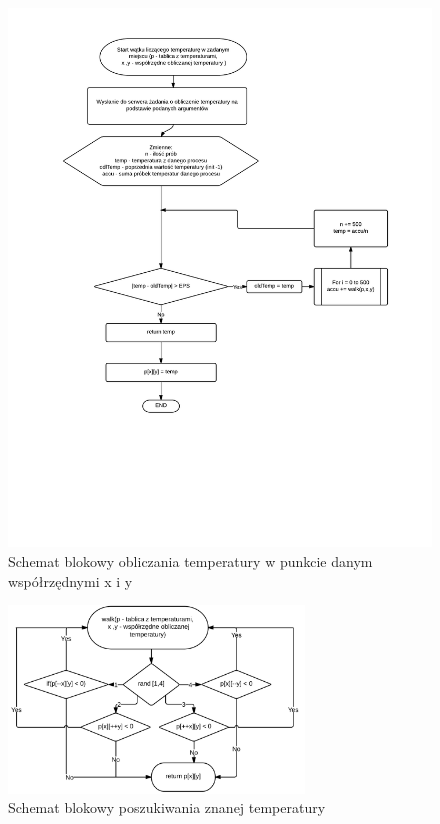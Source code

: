 \documentclass[11pt,a4paper]{article}
\begin{document}
\begin{figure}[H]
\begin{center}
\includegraphics[width=1.0\textwidth]{schemat1.png}
\caption{Schemat blokowy obliczania temperatury w punkcie danym współrzędnymi x i y}
\end{center}
\end{figure}

\begin{figure}[H]
\begin{center}
\includegraphics[width=0.7\textwidth]{schemat2.png}
\caption{Schemat blokowy poszukiwania znanej temperatury}
\end{center}
\end{figure}
\end{document}
